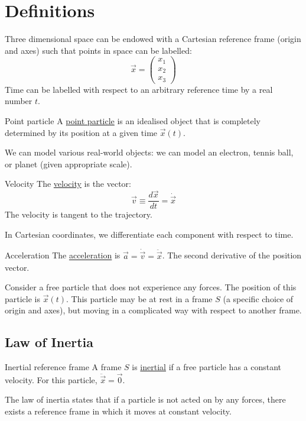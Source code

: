 \documentclass[../Main.tex]{subfiles}
\begin{document}
\section{Definitions}
Three dimensional space can be endowed with a Cartesian reference frame (origin and axes) such that points in space can be labelled:
\begin{equation*}
    \vec{x} = \begin{pmatrix}x_1 \\ x_2 \\ x_3\end{pmatrix}
\end{equation*}
Time can be labelled with respect to an arbitrary reference time by a real number $t$.\par
\begin{definition}{Point particle}
    A \underline{point particle} is an idealised object that is completely determined by its position at a given time $\vec{x}(t)$.
\end{definition}
We can model various real-world objects: we can model an electron, tennis ball, or planet (given appropriate scale).
\begin{definition}{Velocity}
    The \underline{velocity} is the vector:
    \begin{equation*}
        \vec{v} \equiv \frac{d\vec{x}}{dt} = \dot{\vec{x}}
    \end{equation*}
    The velocity is tangent to the trajectory.
\end{definition}
In Cartesian coordinates, we differentiate each component with respect to time.
\begin{definition}{Acceleration}
    The \underline{acceleration} is $\vec{a} = \dot{\vec{v}} = \ddot{\vec{x}}$. The second derivative of the position vector.
\end{definition}
Consider a free particle that does not experience any forces. The position of this particle is $\vec{x}(t)$. This particle may be at rest in a frame $S$ (a specific choice of origin and axes), but moving in a complicated way with respect to another frame.
\subsection{Law of Inertia}
\begin{definition}{Inertial reference frame}
    A frame $S$ is \underline{inertial} if a free particle has a constant velocity. For this particle, $\ddot{\vec{x}} = \vec{0}$.
\end{definition}
The law of inertia states that if a particle is not acted on by any forces, there exists a reference frame in which it moves at constant velocity.
\end{document}

